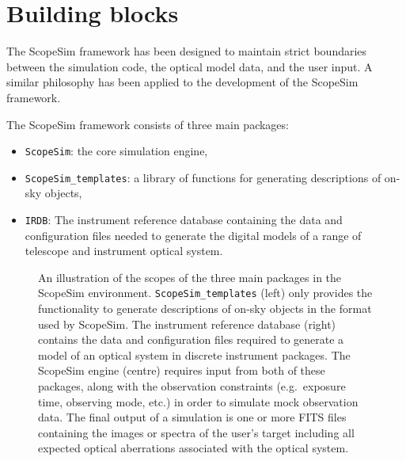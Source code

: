 

\section{Building blocks}
\label{building-blocks}

The ScopeSim framework has been designed to maintain strict boundaries between the simulation code, the optical model data, and the user input.
A similar philosophy has been applied to the development of the ScopeSim framework.

The ScopeSim framework consists of three main packages:
\begin{itemize}
\item \lstinline{ScopeSim}: the core simulation engine,

\item \lstinline{ScopeSim_templates}: a library of functions for generating descriptions of on-sky objects,

\item \lstinline{IRDB}: The instrument reference database containing the data and configuration files needed to generate the digital models of a range of telescope and instrument optical system.
\end{itemize}

\begin{figure}

\caption{An illustration of the scopes of the three main packages in the ScopeSim environment.
\lstinline{ScopeSim_templates} (left) only provides the functionality to generate descriptions of on-sky objects in the format used by ScopeSim.
The instrument reference database (right) contains the data and configuration files required to generate a model of an optical system in discrete instrument packages.
The ScopeSim engine (centre) requires input from both of these packages, along with the observation constraints (e.g.~exposure time, observing mode, etc.) in order to simulate mock observation data.
The final output of a simulation is one or more FITS files containing the images or spectra of the user's  target including all expected optical aberrations associated with the optical system.}
\label{fig:framework}

\end{figure}

